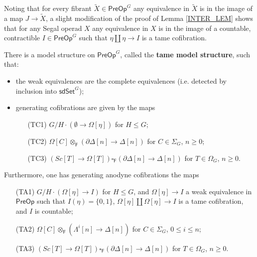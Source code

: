 \documentclass[a4paper,10pt
,draft
]{article}%
\renewcommand{\1}{\eta}%
\begin{document}
\begin{remark}\label{SLIMOD REM}
Noting that for every fibrant 
$\tilde{X} \in \mathsf{PreOp}^G$
any equivalence in $\tilde{X}$ is in the image of a map
$J \to \tilde{X}$, 
a slight modification of the proof of Lemma \ref{INTER_LEM}
shows that for any Segal operad $X$
any equivalence in $X$ is in the image of a countable, contractible
$I \in \mathsf{PreOp}^G$
such that $\eta \amalg \eta \to I$
is a tame cofibration.
\end{remark}




\begin{theorem}
	There is a model structure on 
	$\mathsf{PreOp}^G$,
	called the \textbf{tame model structure},
	such that:
\begin{itemize}
	\item the weak equivalences are the complete equivalences (i.e. detected by inclusion into 
	$\mathsf{sdSet}^G$);
	\item generating cofibrations are given by the maps
	\begin{itemize}
		\item[(TC1)] $G/H \cdot \left(\emptyset \to\Omega[\eta]\right)$ for $H\leq G$;
		\item[(TC2)] $\Omega[C] \otimes_{\mathsf{F}} \left(\partial \Delta[n] \to \Delta[n]\right)$ for $C \in \Sigma_G$, $n \geq 0$;
		\item[(TC3)] 
$\left( Sc[T] \to \Omega[T] \right) 
\square_{\mathsf{F}} 
\left(\partial \Delta[n] \to \Delta[n]\right)$ for $T \in \Omega_G$, $n \geq 0$.
	\end{itemize}
\end{itemize}
Furthermore, one has generating anodyne cofibrations the maps
\begin{itemize}
	\item[(TA1)] $G/H \cdot 
	\left(\Omega[\eta] \to I \right)$ for $H \leq G$,
	and $\Omega[\eta] \to I$ a weak equivalence in $\mathsf{PreOp}$ such that $I(\eta) = \{0,1\}$, $\Omega[\eta] \amalg \Omega[\eta] \to I$ is a tame cofibration, and $I$ is countable;
	\item[(TA2)] $\Omega[C] \otimes_{\mathsf{F}}\left(\Lambda^i[n] \to \Delta[n]\right)$ for $C \in \Sigma_G$, $0 \leq i \leq n$;
	\item[(TA3)] 
$\left( Sc[T] \to \Omega[T] \right) 
\square_{\mathsf{F}} 
\left(\partial \Delta[n] \to \Delta[n]\right)$ for $T \in \Omega_G$, $n \geq 0$.
	\end{itemize}
\end{theorem}
\end{document}
